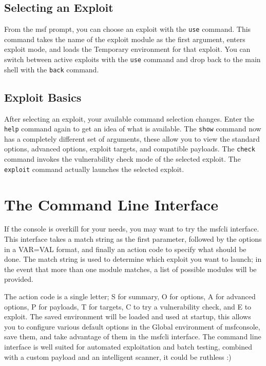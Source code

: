 \documentclass{report}
\begin{document}
    \subsection{Selecting an Exploit}
    \label{CONSOLE-SEL}
\par
From the msf prompt, you can choose an exploit with the \texttt{use} command.
This command takes the name of the exploit module as the first argument, enters
exploit mode, and loads the Temporary environment for that exploit. You can
switch between active exploits with the \texttt{use} command and drop back to
the main shell with the \texttt{back} command. 
   
    \subsection{Exploit Basics}
    \label{CONSOLE-SEL}
\par
After selecting an exploit, your available command selection changes. Enter the 
\texttt{help} command again to get an idea of what is available. The
\texttt{show} command now has a completely different set of arguments, these
allow you to view the standard options, advanced options, exploit targets, and
compatible payloads. The  \texttt{check} command invokes the vulnerability check
mode of the selected exploit. The  \texttt{exploit} command actually launches
the selected exploit.  

    \section{The Command Line Interface}
    \label{STARTED-CLI}
\par
If the console is overkill for your needs, you may want to try the msfcli
interface. This interface takes a match string as the first parameter, followed
by the options in a VAR=VAL format, and finally an action code to specify what
should be done. The match string is used to determine which exploit you want to
launch; in the event that more than one module matches, a list of possible
modules will be provided. 

\par
The action code is a single letter; S for summary, O for options, A for advanced
options, P for payloads, T for targets, C to try a vulnerability check, and E to
exploit. The saved environment will be loaded and used at startup, this allows
you to configure various default options in the Global environment of
msfconsole, save them, and take advantage of them in the msfcli interface.  
The command line interface is well suited for automated exploitation and batch
testing, combined with a custom payload and an intelligent scanner, it could be
ruthless :) 
\end{document}
